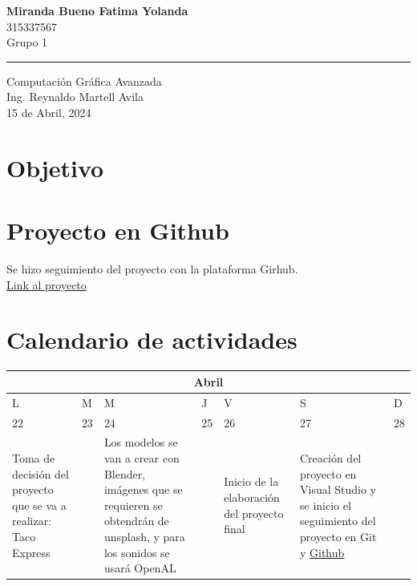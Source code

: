 \documentclass{article}
\begin{document}
\begin{center}
    \Large \textbf{Miranda Bueno Fatima Yolanda}\\
    
    \vspace{0.2cm}
   \vspace{0.2cm}
    \vspace{0.2cm}
    \large 315337567\\
    \vspace{0.2cm}
    \large Grupo 1\\
    \vspace{0.2cm}
    \vspace{2cm}
    \rule{15cm}{0.05cm}

    \vspace{1.5cm}
    \Large Computación Gráfica Avanzada\\
    \Large Ing. Reynaldo Martell Avila\\
    \vspace{0.9cm}
    \large  15 de Abril, 2024
    
    
\end{center}
\clearpage


\section{Objetivo}


\section{Proyecto en Github}

Se hizo seguimiento del proyecto con la plataforma Girhub.\\

\href{https://github.com/MirandaBueno/TacoExpress}{Link al proyecto}

\section{Calendario de actividades}

\begin{center} 
\begin{tabular}{|m{2cm}|m{2cm}|m{2cm}|m{2cm}|m{2cm}|m{2cm}|m{2cm}|} 
\multicolumn{7}{c}{Abril}\\
\hline
L&M&M&J&V&S&D\\
\hline
22&23&24&25&26&27&28\\
Toma de decisión del proyecto que se va a realizar: Taco Express&&Los modelos se van a crear con Blender, imágenes que se requieren se obtendrán de unsplash, y para los sonidos se usará OpenAL&&Inicio de la elaboración del proyecto final&Creación del proyecto en Visual Studio y se inicio el seguimiento del proyecto en Git y  \href{https://github.com/MirandaBueno/TacoExpress}{Github}&\\
\hline
\end{tabular} 
\end{center}
\end{document}
